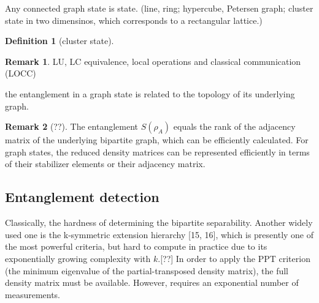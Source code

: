 \documentclass[
aps,
pra,
floatfix,
]{revtex4-2}
\theoremstyle{plain}
\newtheorem{question}{Question}
\theoremstyle{definition}
\newtheorem{definition}{Definition}
\newtheorem{observation}{Observation}
\newtheorem{example}{Example}
\newtheorem{remark}{Remark}
\newtheorem{problem}{Problem}
\newcommand{\U}{\hat{U}}
\newcommand{\dm}{\rho}
\begin{document}
	Any connected graph state is  state.
	(line, ring; 
	hypercube, Petersen graph; 
	cluster state in two dimensinos, which corresponds to a rectangular lattice.)
	\cite{heinEntanglementGraphStates2006}
\begin{definition}[cluster state]\label{def:cluster_state}
\end{definition}
\begin{remark}
	LU, LC equivalence, local operations and classical communication (LOCC)
\end{remark}
the entanglement in a graph state is related to the topology of its underlying graph.

\begin{remark}[??]
	The entanglement  $S( \dm_A )$ equals the rank of the adjacency matrix of the underlying bipartite graph, which can be efficiently calculated.
	For graph states, the reduced density matrices can be represented efficiently in terms of their stabilizer elements or their adjacency matrix.
\end{remark}



\subsection{Entanglement detection}
Classically, the hardness of determining the bipartite separability.
Another widely used one is the k-symmetric extension hierarchy [15, 16], which is presently one of the most powerful criteria, but hard to compute in practice due to its exponentially growing complexity with $k$.[??]
In order to apply the PPT criterion (the minimum eigenvalue of the partial-transposed density matrix), the full density matrix must be available. However,  requires an exponential number of measurements.
\end{document}
